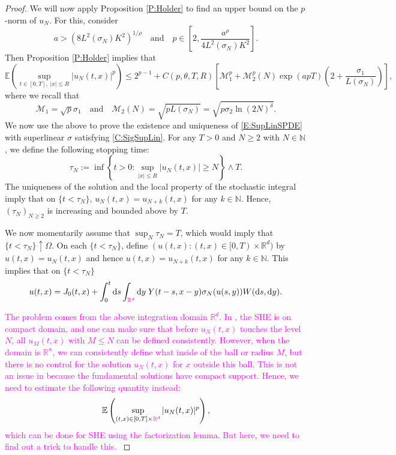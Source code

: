 \documentclass[a4paper,11pt]{article}
\numberwithin{equation}{section}
\theoremstyle{plain}
\theoremstyle{definition}
\newcommand{\ud}{\ensuremath{\mathrm{d} }}
\newcommand{\R}{\mathbb{R}}
\numberwithin{NQ}{section}
\numberwithin{LQ}{section}
\numberwithin{ZQ}{section}
\begin{document}
\begin{proof}
    We will now apply Proposition \ref{P:Holder} to find an upper bound on the $p$-norm of $u_N$.
    For this, consider
		\[
		a > \left( 8 L^2(\sigma_N) K^2 \right)^{1/\rho} \quad \text{and} \quad p \in \left[ 2, \frac{a^{ \rho}}{4L^2(\sigma_N)K^2} \right].
		\]
    Then Proposition \ref{P:Holder} implies that
		\begin{equation} \label{E:u_NMomBdd}
      \mathbb{E}\left(\sup_{t\in[0,T],\; |x| \le  R} |u_N(t,x)|^p\right) \le 2^{p-1} + C(p, \theta, T,R)\left[\mathcal{M}_1^p + \mathcal{M}_2^p(N) \exp(apT)\left(2+ \frac{\sigma_1}{L(\sigma_N)}\right)\right],
      \end{equation}
    where we recall that
		\begin{equation} \label{D:M1&2forSig_N}
      \mathcal{M}_1 = \sqrt{p}\sigma_1 \quad \text{and} \quad \mathcal{M}_2(N) = \sqrt{pL(\sigma_N)} = \sqrt{p\sigma_2\ln(2N)^\delta}.
		\end{equation}
    We now use the above to prove the existence and uniqueness of \eqref{E:SupLinSPDE} with
    superlinear $\sigma$ satisfying \eqref{C:SigSupLin}. For any $T>0$ and $N \ge 2$ with $N\in
    \mathbb{N}$, we define the following stopping time:
		\begin{equation}
      \tau_N := \inf \left\{ t>0 : \sup_{|x| \le R} |u_N(t,x)| \ge N \right\} \wedge T.
		\end{equation}
    The uniqueness of the solution and the local property of the stochastic integral imply that on
    $\{t < \tau_N\}$, $u_N(t,x) = u_{N+k}(t,x)$ for any $k \in \mathbb{N}$. Hence, $(\tau_N)_{N \ge
    2}$ is increasing and bounded above by $T$.

    We now momentarily assume that $\sup_N \tau_N = T$, which would imply that $\{t < \tau_N \}
    \uparrow \Omega$. On each $\{ t < \tau_N \}$, define $(u(t,x) : (t,x) \in [0,T) \times \R^d)$ by
    $u(t,x) = u_N(t,x)$ and hence $u(t,x) = u_{N+k}(t,x)$ for any $k\in \mathbb{N}$. This implies
    that on $\{ t < \tau_N \}$
		\[
      u(t,x) = J_0(t,x) + \int_0^t \ud s \int_{\textcolor{magenta}{\R^d}} \ud y \; Y(t-s,x-y) \sigma_N(u(s,y)) W(\ud s, \ud y).
		\]

    \textcolor{magenta}{The problem comes from the above integration domain $\R^d$. In
      \cite{dalang.khoshnevisan.ea:19:global}, the SHE is on compact domain, and one can make sure
      that before $u_N(t,x)$ touches the level $N$, all $u_M(t,x)$ with $M\le N$ can be defined
      consistently. However, when the domain is $\R^n$, we can consistently define what inside of
    the ball or radius $M$, but there is no control for the solution $u_N(t,x)$ for $x$ outside this
  ball. This is not an issue in \cite{millet.sanz-sole:21:global} because the fundamental solutions
have compact support. Hence, we need to estimate the following quantity instead:
  \begin{align*}
    \mathbb{E}\left(\sup_{(t,x)\in[0,T]\times \textcolor{magenta}{\R^d}} |u_N(t,x)|^p\right),
  \end{align*}
  which can be done for SHE using the factorization lemma. But here, we need to find out a trick to
  handle this.
}


\end{proof}
\end{document}
